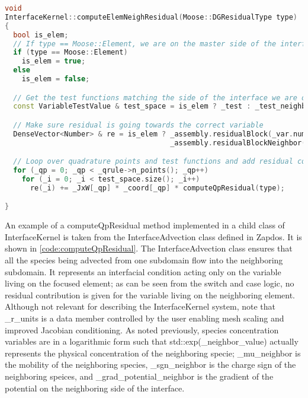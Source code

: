 \begin{lstlisting}[language = C++, caption = The InterfaceKernel :: computeElemNeighResidual method responsible for calling compueQpResidual methods implemented in the various children of the InterfaceKernel class, label = code:InterfaceKernel]
void
InterfaceKernel::computeElemNeighResidual(Moose::DGResidualType type)
{
  bool is_elem;
  // If type == Moose::Element, we are on the master side of the interface, which through MOOSE convention we also call the ``element'' side
  if (type == Moose::Element)
    is_elem = true;
  else
    is_elem = false;

  // Get the test functions matching the side of the interface we are on
  const VariableTestValue & test_space = is_elem ? _test : _test_neighbor;

  // Make sure residual is going towards the correct variable
  DenseVector<Number> & re = is_elem ? _assembly.residualBlock(_var.number()) :
                                       _assembly.residualBlockNeighbor(_neighbor_var.number());

  // Loop over quadrature points and test functions and add residual contributions
  for (_qp = 0; _qp < _qrule->n_points(); _qp++)
    for (_i = 0; _i < test_space.size(); _i++)
      re(_i) += _JxW[_qp] * _coord[_qp] * computeQpResidual(type);

}
\end{lstlisting}

An example of a computeQpResidual method implemented in a child class of InterfaceKernel is taken from the InterfaceAdvection class defined in Zapdos. It is shown in \cref{code:computeQpResidual}. The InterfaceAdvection class ensures that all the species being advected from one subdomain flow into the neighboring subdomain. It represents an interfacial condition acting only on the variable living on the focused element; as can be seen from the switch and case logic, no residual contribution is given for the variable living on the neighboring element. Although not relevant for describing the InterfaceKernel system, note that \_r\_units is a data member controlled by the user enabling mesh scaling and improved Jacobian conditioning. As noted previously, species concentration variables are in a logarithmic form such that std::exp(\_neighbor\_value) actually represents the physical concentration of the neighboring specie; \_mu\_neighbor is the mobility of the neighboring species, \_sgn\_neighbor is the charge sign of the neighboring speices, and \_grad\_potential\_neighbor is the gradient of the potential on the neighboring side of the interface.

